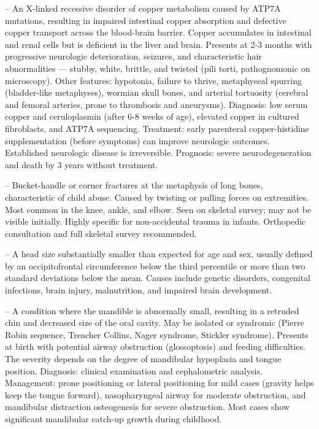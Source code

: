 -- An X-linked recessive disorder of copper metabolism caused by ATP7A mutations, resulting in impaired intestinal copper absorption and defective copper transport across the blood-brain barrier. Copper accumulates in intestinal and renal cells but is deficient in the liver and brain. Presents at 2-3 months with progressive neurologic deterioration, seizures, and characteristic hair abnormalities — stubby, white, brittle, and twisted (pili torti, pathognomonic on microscopy). Other features: hypotonia, failure to thrive, metaphyseal spurring (bladder-like metaphyses), wormian skull bones, and arterial tortuosity (cerebral and femoral arteries, prone to thrombosis and aneurysms). Diagnosis: low serum copper and ceruloplasmin (after 6-8 weeks of age), elevated copper in cultured fibroblasts, and ATP7A sequencing. Treatment: early parenteral copper-histidine supplementation (before symptoms) can improve neurologic outcomes. Established neurologic disease is irreversible. Prognosis: severe neurodegeneration and death by 3 years without treatment.

-- Bucket-handle or corner fractures at the metaphysis of long bones, characteristic of child abuse. Caused by twisting or pulling forces on extremities. Most common in the knee, ankle, and elbow. Seen on skeletal survey; may not be visible initially. Highly specific for non-accidental trauma in infants. Orthopedic consultation and full skeletal survey recommended.

-- A head size substantially smaller than expected for age and sex, usually defined by an occipitofrontal circumference below the third percentile or more than two standard deviations below the mean. Causes include genetic disorders, congenital infections, brain injury, malnutrition, and impaired brain development.

-- A condition where the mandible is abnormally small, resulting in a retruded chin and decreased size of the oral cavity. May be isolated or syndromic (Pierre Robin sequence, Treacher Collins, Nager syndrome, Stickler syndrome). Presents at birth with potential airway obstruction (glossoptosis) and feeding difficulties. The severity depends on the degree of mandibular hypoplasia and tongue position. Diagnosis: clinical examination and cephalometric analysis. Management: prone positioning or lateral positioning for mild cases (gravity helps keep the tongue forward), nasopharyngeal airway for moderate obstruction, and mandibular distraction osteogenesis for severe obstruction. Most cases show significant mandibular catch-up growth during childhood.

